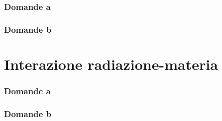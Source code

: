 \documentclass[10pt,a4paper]{article}
\begin{document}
\section{Domande a}
\section{Domande b}


\part{Interazione radiazione-materia}
\setcounter{section}{0}
\renewcommand*{\theHsection}{chX.\the\value{section}}
\section{Domande a}
\section{Domande b}
\end{document}

